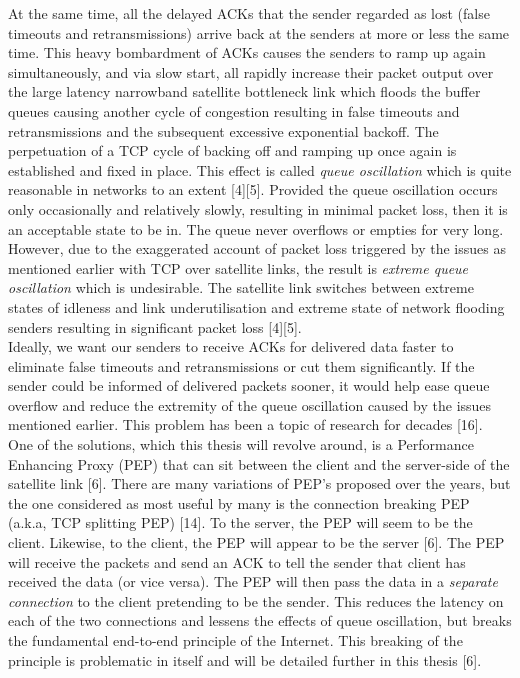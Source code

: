 \documentclass{uathesis}
\begin{document}
At the same time, all the delayed ACKs that the sender regarded as lost (false timeouts and retransmissions) arrive back at the senders at more or less the same time. This heavy bombardment of ACKs causes the senders to ramp up again simultaneously, and via slow start, all rapidly increase their packet output over the large latency narrowband satellite bottleneck link which floods the buffer queues causing another cycle of congestion resulting in false timeouts and retransmissions and the subsequent excessive exponential backoff. The perpetuation of a TCP cycle of backing off and ramping up once again is established and fixed in place. This effect is called \emph{queue oscillation} which is quite reasonable in networks to an extent [4][5]. Provided the queue oscillation occurs only occasionally and relatively slowly, resulting in minimal packet loss, then it is an acceptable state to be in. The queue never overflows or empties for very long. However, due to the exaggerated account of packet loss triggered by the issues as mentioned earlier with TCP over satellite links, the result is \emph{extreme queue oscillation} which is undesirable. The satellite link switches between extreme states of idleness and link underutilisation and extreme state of network flooding senders resulting in significant packet loss [4][5].\\


Ideally, we want our senders to receive ACKs for delivered data faster to eliminate false timeouts and retransmissions or cut them significantly. If the sender could be informed of delivered packets sooner, it would help ease queue overflow and reduce the extremity of the queue oscillation caused by the issues mentioned earlier. This problem has been a topic of research for decades [16]. One of the solutions, which this thesis will revolve around, is a Performance Enhancing Proxy (PEP) that can sit between the client and the server-side of the satellite link [6]. There are many variations of PEP's proposed over the years, but the one considered as most useful by many is the connection breaking PEP (a.k.a, TCP splitting PEP) [14]. To the server, the PEP will seem to be the client. Likewise, to the client, the PEP will appear to be the server [6]. The PEP will receive the packets and send an ACK to tell the sender that client has received the data (or vice versa). The PEP will then pass the data in a \emph{separate connection} to the client pretending to be the sender. This reduces the latency on each of the two connections and lessens the effects of queue oscillation, but breaks the fundamental end-to-end principle of the Internet. This breaking of the principle is problematic in itself and will be detailed further in this thesis [6]. \\
\end{document}
